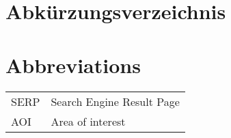 \ifmmtlanguagegerman
\section*{Abkürzungsverzeichnis}
\else
\section*{Abbreviations}
\fi

\begin{table}[h]		
	\begin{tabular}{ll}
		SERP & Search Engine Result Page \\
		AOI & Area of interest \\
	\end{tabular}
\end{table}
